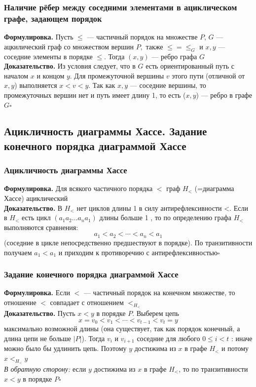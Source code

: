 \documentclass[a4paper]{article}
\newcommand{\qed}{\hfill$\square$}
\begin{document}
\subsubsection*{Наличие рёбер между соседними элементами в ациклическом графе, задающем порядок}
\textbf{Формулировка.} Пусть $\leqslant$ — частичный порядок на множестве $P$, $G$ — ацкилический граф со множеством вершин $P,$ также $\leqslant=\leqslant_G$ и $x,y$ — соседние элементы в порядке $\leqslant$. Тогда $(x,y)$ — ребро графа $G$\\[2mm]
\indent\textbf{Доказательство.} Из условия следует, что в $G$ есть ориентированный путь с началом $x$ и концом $y$. Для промежуточной вершины $v$ этого пути (отличной от $x, y$) выполняется $x < v < y$. Так как $x, y$ — соседние вершины, то промежуточных вершин нет и путь имеет длину 1, то есть ($x, y$) — ребро в графе $G$\qed

\subsection{Ацикличность диаграммы Хассе. Задание конечного порядка диаграммой Хассе}
\subsubsection*{Ацикличность диаграммы Хассе}
\textbf{Формулировка.} Для всякого частичного порядка $<$ граф $H_<$ (=диаграмма Хассе) ациклический\\[2mm]
\indent\textbf{Доказательство.} В $H_{<}$ нет циклов длины 1 в силу антирефлексивности <. Если в $H_{<}$ есть цикл $\left(a_1 a_2 \ldots a_n a_1\right)$ длины больше 1 , то по определению графа $H_{<}$ выполняются сравнения:
$$a_1<a_2<\cdots<a_n<a_1$$
(соседние в цикле непосредственно предшествуют в порядке). По транзитивности получаем $a_1<a_1$ и приходим к противоречию с антирефлексивностью\qed

\subsubsection*{Задание конечного порядка диаграммой Хассе}
\textbf{Формулировка.} Если $<$ — частичный порядок на конечном множестве, то отношение $<$ совпадает с отношением $<_{H_<}$\\[2mm]
\indent\textbf{Доказательство.} Пусть $x<y$ в порядке $P$. Выберем цепь $$x=v_0<v_1<\cdots<v_{t-1}<v_t=y$$
максимально возможной длины (она существует, так как порядок конечный, а длина цепи не больше $|P|$). Тогда $v_i$ и $v_{i+1}$ соседние для любого $0 \leqslant i<t$ : иначе можно было бы удлинить цепь. Поэтому $y$ достижима из $x$ в графе $H_{<}$ и потому $x<_{H_{<}} y$\\[2mm]
\indent\textit{В обратную сторону:} если $y$ достижима из $x$ в графе $H_{<}$, то по транзитивности $x<y$ в порядке $P$\qed
\end{document}
